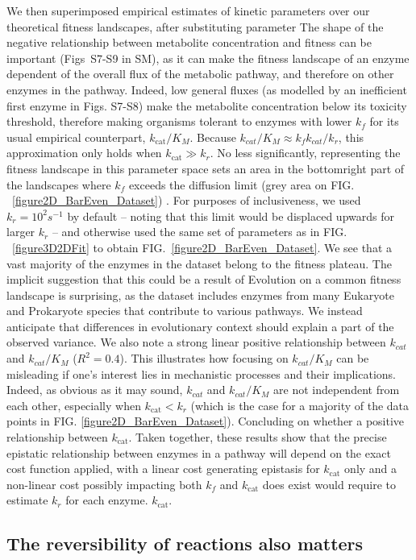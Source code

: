 \documentclass[11pt,onecolumn]{article}
\providecommand{\DIFadd}[1]{{\protect\color{blue} \sf #1}} %
\providecommand{\DIFdel}[1]{{\protect\color{red} \scriptsize #1}} %
\providecommand{\DIFaddbegin}{} %
\providecommand{\DIFaddend}{} %
\providecommand{\DIFdelbegin}{} %
\providecommand{\DIFdelend}{} %
\begin{document}
\DIFdel{We then superimposed empirical estimates of kinetic parameters over our theoretical fitness landscapes, after substituting parameter }\DIFdelend \DIFaddbegin \DIFadd{The shape of the negative relationship between metabolite concentration and fitness can be important (Figs~S7-S9 in SM), as it can make the fitness landscape of an enzyme dependent of the overall flux of the metabolic pathway, and therefore on other enzymes in the pathway. Indeed, low general fluxes (as modelled by an inefficient first enzyme in Figs. S7-S8) make the metabolite concentration below its toxicity threshold, therefore making organisms tolerant to enzymes with lower }\DIFaddend $k_f$ \DIFdelbegin \DIFdel{for its usual empirical counterpart, $k_\text{cat} / K_M$. Because $k_{cat}/K_M \approx k_fk_{cat}/k_r$, this approximation only holds when $k_\text{cat} \gg k_r$. No less significantly, representing the fitness landscape in this parameter space
sets an area in the bottomright part of the landscapes where $k_f$ exceeds the diffusion limit (grey area on FIG. ~\ref{figure2D_BarEven_Dataset}) . For purposes of inclusiveness, we used $k_r=10^{2}s^{-1}$ by default -- noting that this limit would be displaced upwards for larger $k_r$ -- and otherwise used the same set of parameters as in FIG. ~\ref{figure3D2DFit} to obtain FIG.~\ref{figure2D_BarEven_Dataset}. We see that a vast majority of the enzymes in the \citet{Bar-Even11} dataset belong to the fitness plateau. 
The implicit suggestion that this could be a result of Evolution on a common fitness landscape is surprising, as the dataset includes enzymes from many Eukaryote and Prokaryote species that contribute to various pathways. We instead anticipate that differences in evolutionary context should explain a part of the observed variance. We also note a strong linear positive relationship between $k_{cat}$ }\DIFdelend and \DIFdelbegin \DIFdel{$k_{cat}/K_M$ (\textbf{$R^2=0.4$}). This illustrates how focusing on $k_{cat}/K_M$ can be misleading if one's interest lies in mechanistic processes and their implications. Indeed, as obvious as it may sound, $k_{cat}$ and $k_{cat}/K_M$ are not independent from each other, especially when $k_\text{cat}<k_r$ (which is the case for a majority of the data points in FIG. \ref{figure2D_BarEven_Dataset}). Concluding on whether a positive relationship between }\DIFdelend \DIFaddbegin \DIFadd{$k_\text{cat}$. Taken together, these results show that the precise epistatic relationship between enzymes in a pathway will depend on the exact cost function applied, with a linear cost generating epistasis for $k_\text{cat}$ only and a non-linear cost possibly impacting both }\DIFaddend $k_f$ and \DIFdelbegin \DIFdel{$k_\text{cat}$ does exist would require to estimate $k_r$ for each enzyme.
}\DIFdelend \DIFaddbegin \DIFadd{$k_\text{cat}$. 
}\subsection{\DIFadd{The reversibility of reactions also matters}}
\DIFaddend 
\end{document}
